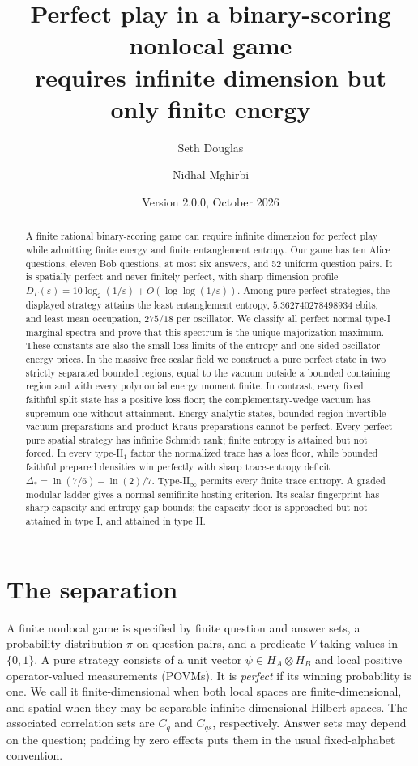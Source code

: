 \documentclass[11pt]{article}
\title{Perfect play in a binary-scoring nonlocal game\\requires infinite dimension but only finite energy}
\author{Seth Douglas \and Nidhal Mghirbi}
\date{Version 2.0.0, October 2026}
\theoremstyle{definition}
\newcommand{\eps}{\varepsilon}
\begin{document}
\maketitle
\begingroup\renewcommand{\thefootnote}{}\endgroup
\begin{abstract}
A finite rational binary-scoring game can require infinite dimension for perfect play while admitting finite energy and finite entanglement entropy. Our game has ten Alice questions, eleven Bob questions, at most six answers, and 52 uniform question pairs. It is spatially perfect and never finitely perfect, with sharp dimension profile $D_\Gamma(\eps)=10\log_2(1/\eps)+O(\log\log(1/\eps))$. Among pure perfect strategies, the displayed strategy attains the least entanglement entropy, $5.362740278498934$ ebits, and least mean occupation, $275/18$ per oscillator. We classify all perfect normal type-I marginal spectra and prove that this spectrum is the unique majorization maximum. These constants are also the small-loss limits of the entropy and one-sided oscillator energy prices. In the massive free scalar field we construct a pure perfect state in two strictly separated bounded regions, equal to the vacuum outside a bounded containing region and with every polynomial energy moment finite. In contrast, every fixed faithful split state has a positive loss floor; the complementary-wedge vacuum has supremum one without attainment. Energy-analytic states, bounded-region invertible vacuum preparations and product-Kraus preparations cannot be perfect. Every perfect pure spatial strategy has infinite Schmidt rank; finite entropy is attained but not forced. In every type-II$_1$ factor the normalized trace has a loss floor, while bounded faithful prepared densities win perfectly with sharp trace-entropy deficit $\Delta_* = \ln(7/6)-\ln(2)/7$. Type-II$_\infty$ permits every finite trace entropy. A graded modular ladder gives a normal semifinite hosting criterion. Its scalar fingerprint has sharp capacity and entropy-gap bounds; the capacity floor is approached but not attained in type I, and attained in type II.
\end{abstract}

\section{The separation}
A finite nonlocal game is specified by finite question and answer sets, a probability distribution $\pi$ on question pairs, and a predicate $V$ taking values in $\{0,1\}$. A pure strategy consists of a unit vector $\psi\in H_A\otimes H_B$ and local positive operator-valued measurements (POVMs). It is \emph{perfect} if its winning probability is one. We call it finite-dimensional when both local spaces are finite-dimensional, and spatial when they may be separable infinite-dimensional Hilbert spaces. The associated correlation sets are $C_q$ and $C_{qs}$, respectively. Answer sets may depend on the question; padding by zero effects puts them in the usual fixed-alphabet convention.
\end{document}
